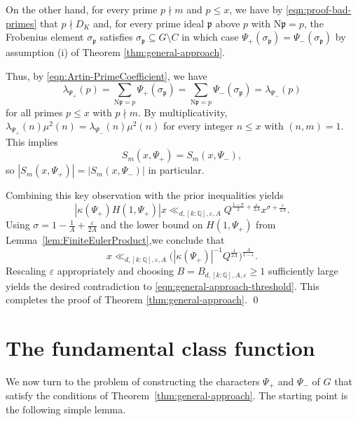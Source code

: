 \documentclass[12pt]{amsart}
\theoremstyle{definition} \newtheorem{definition}[theorem]{Definition}
\theoremstyle{example} \newtheorem{example}[theorem]{Example}
\theoremstyle{remark} \newtheorem{remark}{Remark}[theorem]
\numberwithin{equation}{section}
\numberwithin{theorem}{section}
\renewcommand{\epsilon}{\varepsilon}
\renewcommand{\leq}{\leqslant}
\renewcommand{\geq}{\geqslant}
\newcommand{\N}{\mathrm{N}} %
\newcommand{\Q}{\mathbb{Q}}
\newcommand{\kp}{\mathfrak{p}}
\begin{document}
On the other hand, for every prime $p \nmid m$ and $p \leq x$, we have by \eqref{eqn:proof-bad-primes} that $p \nmid D_K$ and, for every prime ideal $\kp$ above $p$ with $\N\kp =p$, the Frobenius element $\sigma_{\kp}$ satisfies $\sigma_{\kp} \subseteq G \setminus C$ in which case $\Psi_+(\sigma_{\kp}) = \Psi_-(\sigma_{\kp})$ by assumption (i) of Theorem \ref{thm:general-approach}. 


 Thus, by \eqref{eqn:Artin-PrimeCoefficient}, we have
\[
\lambda_{\Psi_+}(p) = \sum_{\N\kp = p} \Psi_+(\sigma_{\kp}) = \sum_{\N\kp = p} \Psi_-(\sigma_{\kp}) = \lambda_{\Psi_-}(p)
\]
for all primes $p \leq x$ with $p \nmid m$. By multiplicativity, $\lambda_{\Psi_+}(n) \mu^2(n) = \lambda_{\Psi_-}(n) \mu^2(n)$ for every integer $n \leq x$ with $(n,m) = 1$. This implies 
\[
S_m(x,\Psi_+) = S_m(x,\Psi_-), 
\]
so $|S_m(x,\Psi_+)| = |S_m(x,\Psi_-)|$ in particular. 

Combining this key observation with the prior inequalities yields
\[ 
|\kappa(\Psi_+) H(1,\Psi_+)|  x \ll_{d,[k:\Q],\epsilon,A}  Q^{\frac{1-\sigma}{2} + \frac{\epsilon}{2A}} x^{\sigma+ \frac{\epsilon}{2A}}. 
\]
Using $\sigma = 1 - \frac{1}{A}+\frac{\epsilon}{2A}$ and the lower bound on $H(1,\Psi_+)$ from Lemma~\ref{lem:FiniteEulerProduct},we conclude that
\[
x \ll_{d,[k:\Q],\epsilon,A}  \Big(  |\kappa(\Psi_+)|^{-1} Q^{\frac{1}{2A}}\Big)^{\frac{A}{1-\epsilon}}. 
\]
Rescaling $\epsilon$ appropriately and choosing $B = B_{d,[k:\Q],A,\epsilon} \geq 1$ sufficiently large yields the desired contradiction to \eqref{eqn:general-approach-threshold}. This completes the proof of Theorem \ref{thm:general-approach}.
\hfill \qed 


\section{The fundamental class function}
	\label{sec:class-function}

	\allowdisplaybreaks

	We now turn to the problem of constructing the characters $\Psi_+$ and $\Psi_-$ of $G$ that satisfy the conditions of Theorem~\ref{thm:general-approach}.  The starting point is the following simple lemma.
	
\end{document}
